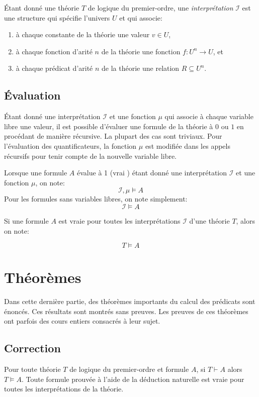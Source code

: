Étant donné une théorie $T$ de logique du premier-ordre, une \og \textit{interprétation} \fg{} $\mathcal{I}$ est une structure qui spécifie l'univers $U$ et qui associe:
\begin{enumerate}
\item à chaque constante de la théorie une valeur $v \in U$,
\item à chaque fonction d'arité $n$ de la théorie une fonction $f : U^n \to U$, et
\item à chaque prédicat d'arité $n$ de la théorie une relation $R \subseteq U^n$.
\end{enumerate}

\subsection{Évaluation}

Étant donné une interprétation $\mathcal{I}$ et une fonction $\mu$ qui associe à chaque variable libre une valeur, il est possible d'évaluer une formule de la théorie à $0$ ou $1$ en procédant de manière récursive.
La plupart des cas sont triviaux. Pour l'évaluation des quantificateurs, la fonction $\mu$ est modifiée dans les appels récursifs pour tenir compte de la nouvelle variable libre.

Lorsque une formule $A$ évalue à 1 (\og vrai \fg{}) étant donné une interprétation $\mathcal{I}$ et une fonction $\mu$, on note:
\[
\mathcal{I}, \mu \vDash A
\]
Pour les formules sans variables libres, on note simplement:
\[
\mathcal{I} \vDash A
\]

Si une formule $A$ est vraie pour toutes les interprétations $\mathcal{I}$ d'une théorie $T$, alors on note:

\[
T \vDash A
\]

\section{Théorèmes}

Dans cette dernière partie, des théorèmes importants du calcul des prédicats sont énoncés.
Ces résultats sont montrés sans preuves.
Les preuves de ces théorèmes ont parfois des cours entiers consacrés à leur sujet.

\subsection{Correction}

Pour toute théorie $T$ de logique du premier-ordre et formule $A$, si $T \vdash A$ alors $T \vDash A$.
Toute formule prouvée à l'aide de la déduction naturelle est vraie pour toutes les interprétations de la théorie.

